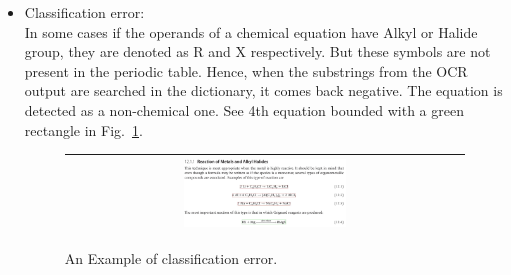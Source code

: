 \documentclass[12pt]{IEEEtran}
\begin{document}
\begin{itemize}
 \item Classification error:\\
 In some cases if the operands of a chemical equation have Alkyl or Halide group, 
 they are denoted as R and X respectively. 
 But these symbols are not present in the periodic table.
 Hence, when the substrings from the OCR output are searched in the dictionary, it comes back negative.
 The equation is detected as a non-chemical one. See 4th equation bounded with a green rectangle in Fig.~\ref{cl_error}.  
\begin{figure}[h]\center\footnotesize
\begin{tabular}{|c|}
\hline
 \includegraphics[width=0.42\textwidth]{cbook16.png} \\ \hline
 \end{tabular} 
 \caption{An Example of classification error.}
 \label{cl_error}
\end{figure}
\end{itemize}
\end{document}
